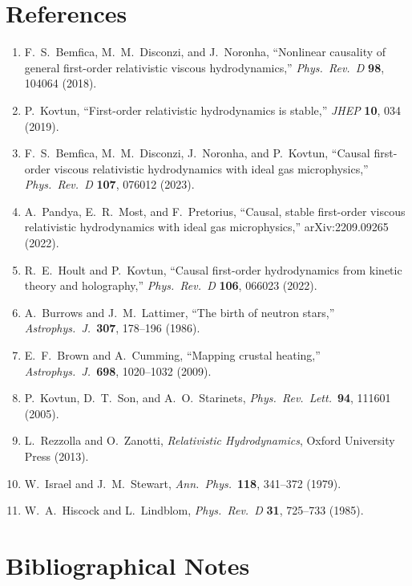 \section*{References}
\label{sec:rel-1-refs}

\begin{enumerate}
\item F.~S.~Bemfica, M.~M.~Disconzi, and J.~Noronha,
  ``Nonlinear causality of general first-order relativistic viscous
  hydrodynamics,'' \textit{Phys.\ Rev.\ D} \textbf{98}, 104064 (2018).
\item P.~Kovtun, ``First-order relativistic hydrodynamics is stable,''
  \textit{JHEP} \textbf{10}, 034 (2019).
\item F.~S.~Bemfica, M.~M.~Disconzi, J.~Noronha, and P.~Kovtun,
  ``Causal first-order viscous relativistic hydrodynamics with ideal gas
  microphysics,'' \textit{Phys.\ Rev.\ D} \textbf{107}, 076012 (2023).
\item A.~Pandya, E.~R.~Most, and F.~Pretorius,
  ``Causal, stable first-order viscous relativistic hydrodynamics with
  ideal gas microphysics,'' arXiv:2209.09265 (2022).
\item R.~E.~Hoult and P.~Kovtun,
  ``Causal first-order hydrodynamics from kinetic theory and holography,''
  \textit{Phys.\ Rev.\ D} \textbf{106}, 066023 (2022).
\item A.~Burrows and J.~M.~Lattimer, ``The birth of neutron stars,''
  \textit{Astrophys.\ J.}\ \textbf{307}, 178--196 (1986).
\item E.~F.~Brown and A.~Cumming, ``Mapping crustal heating,''
  \textit{Astrophys.\ J.}\ \textbf{698}, 1020--1032 (2009).
\item P.~Kovtun, D.~T.~Son, and A.~O.~Starinets,
  \textit{Phys.\ Rev.\ Lett.}\ \textbf{94}, 111601 (2005).
\item L.~Rezzolla and O.~Zanotti, \textit{Relativistic Hydrodynamics},
  Oxford University Press (2013).
\item W.~Israel and J.~M.~Stewart,
  \textit{Ann.\ Phys.}\ \textbf{118}, 341--372 (1979).
\item W.~A.~Hiscock and L.~Lindblom,
  \textit{Phys.\ Rev.\ D} \textbf{31}, 725--733 (1985).
\end{enumerate}

\section*{Bibliographical Notes}
\label{sec:rel-1-bib}


